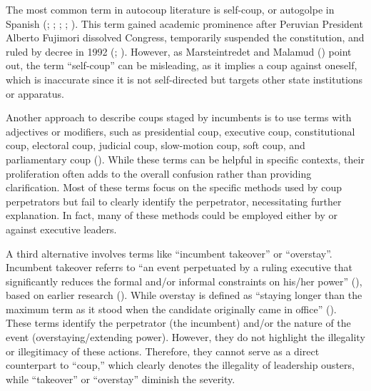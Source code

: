 \documentclass[
  12pt,
]{report}
\begin{document}
The most common term in autocoup literature is self-coup, or autogolpe
in Spanish (;
;
; ; ). This term gained academic prominence after Peruvian President
Alberto Fujimori dissolved Congress, temporarily suspended the
constitution, and ruled by decree in 1992
(;
). However, as
Marsteintredet and Malamud ()
point out, the term ``self-coup'' can be misleading, as it implies a
coup against oneself, which is inaccurate since it is not self-directed
but targets other state institutions or apparatus.

Another approach to describe coups staged by incumbents is to use terms
with adjectives or modifiers, such as presidential coup, executive coup,
constitutional coup, electoral coup, judicial coup, slow-motion coup,
soft coup, and parliamentary coup
().
While these terms can be helpful in specific contexts, their
proliferation often adds to the overall confusion rather than providing
clarification. Most of these terms focus on the specific methods used by
coup perpetrators but fail to clearly identify the perpetrator,
necessitating further explanation. In fact, many of these methods could
be employed either by or against executive leaders.

A third alternative involves terms like ``incumbent takeover'' or
``overstay''. Incumbent takeover referrs to ``an event perpetuated by a
ruling executive that significantly reduces the formal and/or informal
constraints on his/her power'' (), based on earlier research
(). While overstay is defined as
``staying longer than the maximum term as it stood when the candidate
originally came in office''
(). These terms identify the perpetrator (the incumbent) and/or the
nature of the event (overstaying/extending power). However, they do not
highlight the illegality or illegitimacy of these actions. Therefore,
they cannot serve as a direct counterpart to ``coup,'' which clearly
denotes the illegality of leadership ousters, while ``takeover'' or
``overstay'' diminish the severity.
\end{document}
